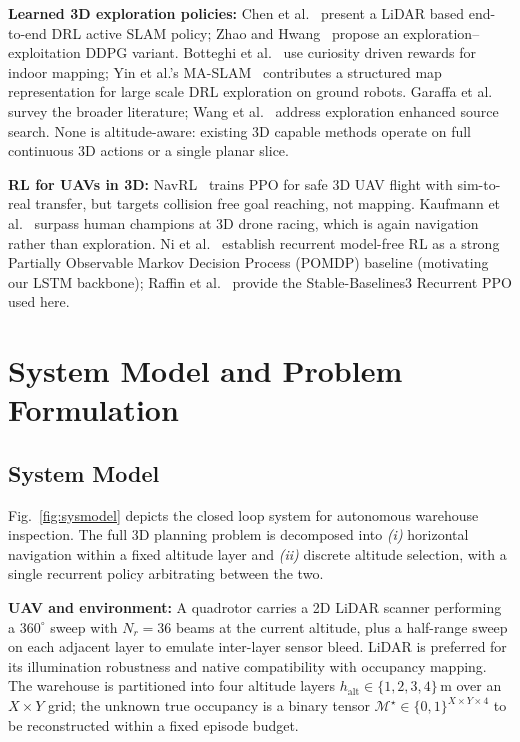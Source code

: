 \documentclass[runningheads]{llncs}
\begin{document}
\textbf{Learned 3D exploration policies:} Chen et al.~\cite{chen2024lidar} present a LiDAR based end-to-end DRL active SLAM policy; Zhao and Hwang~\cite{zhao2024ddpg} propose an exploration--exploitation DDPG variant. Botteghi et al.~\cite{botteghi2021curiosity} use curiosity driven rewards for indoor mapping; Yin et al.'s MA-SLAM~\cite{yin2025maslam} contributes a structured map representation for large scale DRL exploration on ground robots. Garaffa et al.~\cite{garaffa2023survey} survey the broader literature; Wang et al.~\cite{wang2024exploration} address exploration enhanced source search. None is altitude-aware: existing 3D capable methods operate on full continuous 3D actions or a single planar slice.

\textbf{RL for UAVs in 3D:} NavRL~\cite{xu2025navrl} trains PPO for safe 3D UAV flight with sim-to-real transfer, but targets collision free goal reaching, not mapping. Kaufmann et al.~\cite{kaufmann2023racing} surpass human champions at 3D drone racing, which is again navigation rather than exploration. Ni et al.~\cite{ni2022recurrent} establish recurrent model-free RL as a strong Partially Observable Markov Decision Process (POMDP) baseline (motivating our LSTM backbone); Raffin et al.~\cite{raffin2021sb3} provide the Stable-Baselines3 Recurrent PPO used here.

\section{System Model and Problem Formulation}

\subsection{System Model}
Fig.~\ref{fig:sysmodel} depicts the closed loop system for autonomous warehouse inspection. The full 3D planning problem is decomposed into \emph{(i)} horizontal navigation within a fixed altitude layer and \emph{(ii)} discrete altitude selection, with a single recurrent policy arbitrating between the two.

\textbf{UAV and environment:} A quadrotor carries a 2D LiDAR scanner performing a $360^\circ$ sweep with $N_r\!=\!36$ beams at the current altitude, plus a half-range sweep on each adjacent layer to emulate inter-layer sensor bleed. LiDAR is preferred for its illumination robustness and native compatibility with occupancy mapping. The warehouse is partitioned into four altitude layers $h_{\text{alt}}\!\in\!\{1,2,3,4\}\,\text{m}$ over an $X\!\times\!Y$ grid; the unknown true occupancy is a binary tensor $\mathcal{M}^{\star}\!\in\!\{0,1\}^{X\times Y\times 4}$ to be reconstructed within a fixed episode budget.
\end{document}
